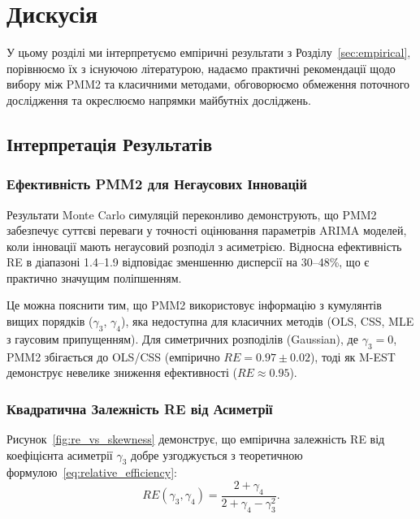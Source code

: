 \documentclass[12pt,a4paper]{article}
\begin{document}

\section{Дискусія}
\label{sec:discussion}

У цьому розділі ми інтерпретуємо емпіричні результати з Розділу~\ref{sec:empirical}, порівнюємо їх з існуючою літературою, надаємо практичні рекомендації щодо вибору між PMM2 та класичними методами, обговорюємо обмеження поточного дослідження та окреслюємо напрямки майбутніх досліджень.

\subsection{Інтерпретація Результатів}
\label{subsec:interpretation}

\subsubsection{Ефективність PMM2 для Негаусових Інновацій}

Результати Monte Carlo симуляцій переконливо демонструють, що PMM2 забезпечує суттєві переваги у точності оцінювання параметрів ARIMA моделей, коли інновації мають негаусовий розподіл з асиметрією. Відносна ефективність RE в діапазоні 1.4--1.9 відповідає зменшенню дисперсії на 30--48\%, що є практично значущим поліпшенням.

Це можна пояснити тим, що PMM2 використовує інформацію з кумулянтів вищих порядків ($\gamma_3$, $\gamma_4$), яка недоступна для класичних методів (OLS, CSS, MLE з гаусовим припущенням). Для симетричних розподілів (Gaussian), де $\gamma_3 = 0$, PMM2 збігається до OLS/CSS (емпірично $RE = 0.97 \pm 0.02$), тоді як M-EST демонструє невелике зниження ефективності ($RE \approx 0.95$).

\subsubsection{Квадратична Залежність RE від Асиметрії}

Рисунок~\ref{fig:re_vs_skewness} демонструє, що емпірична залежність RE від коефіцієнта асиметрії $\gamma_3$ добре узгоджується з теоретичною формулою~\eqref{eq:relative_efficiency}:
\begin{equation}
    RE(\gamma_3, \gamma_4) = \frac{2 + \gamma_4}{2 + \gamma_4 - \gamma_3^2}.
\end{equation}
\end{document}
